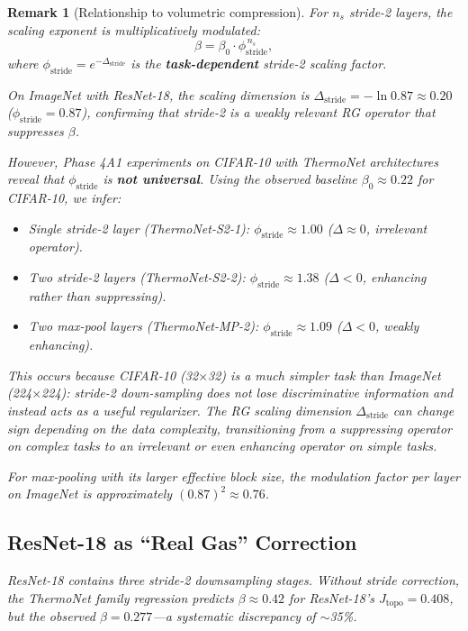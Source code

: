 \documentclass[11pt, a4paper]{article}
\theoremstyle{plain}
\newtheorem*{remark}{Remark}
\begin{document}
\begin{remark}[Relationship to volumetric compression]
For $n_s$ stride-2 layers, the scaling exponent is multiplicatively modulated:
\begin{equation}
\boxed{\beta = \beta_0 \cdot \phi_{\mathrm{stride}}^{\,n_s}},
\end{equation}
where $\phi_{\mathrm{stride}} = e^{-\Delta_{\mathrm{stride}}}$ is the \textbf{task-dependent} stride-2 scaling factor.

On ImageNet with ResNet-18, the scaling dimension is $\Delta_{\mathrm{stride}} = -\ln 0.87 \approx 0.20$ ($\phi_{\mathrm{stride}} = 0.87$), confirming that stride-2 is a \emph{weakly relevant} RG operator that suppresses $\beta$.

However, Phase 4A1 experiments on CIFAR-10 with ThermoNet architectures reveal that $\phi_{\mathrm{stride}}$ is \textbf{not universal}. Using the observed baseline $\beta_0 \approx 0.22$ for CIFAR-10, we infer:
\begin{itemize}
    \item Single stride-2 layer (ThermoNet-S2-1): $\phi_{\mathrm{stride}} \approx 1.00$ ($\Delta \approx 0$, irrelevant operator).
    \item Two stride-2 layers (ThermoNet-S2-2): $\phi_{\mathrm{stride}} \approx 1.38$ ($\Delta < 0$, \emph{enhancing} rather than suppressing).
    \item Two max-pool layers (ThermoNet-MP-2): $\phi_{\mathrm{stride}} \approx 1.09$ ($\Delta < 0$, weakly enhancing).
\end{itemize}
This occurs because CIFAR-10 (32$\times$32) is a much simpler task than ImageNet (224$\times$224): stride-2 down-sampling does not lose discriminative information and instead acts as a useful regularizer. The RG scaling dimension $\Delta_{\mathrm{stride}}$ can change sign depending on the data complexity, transitioning from a suppressing operator on complex tasks to an irrelevant or even enhancing operator on simple tasks.

For max-pooling with its larger effective block size, the modulation factor per layer on ImageNet is approximately $(0.87)^2 \approx 0.76$.

\subsection{ResNet-18 as ``Real Gas'' Correction}

ResNet-18 contains three stride-2 downsampling stages. Without stride correction, the ThermoNet family regression predicts $\beta \approx 0.42$ for ResNet-18's $J_{\mathrm{topo}} = 0.408$, but the observed $\beta = 0.277$---a systematic discrepancy of $\sim$35\%.


\end{remark}
\end{document}
